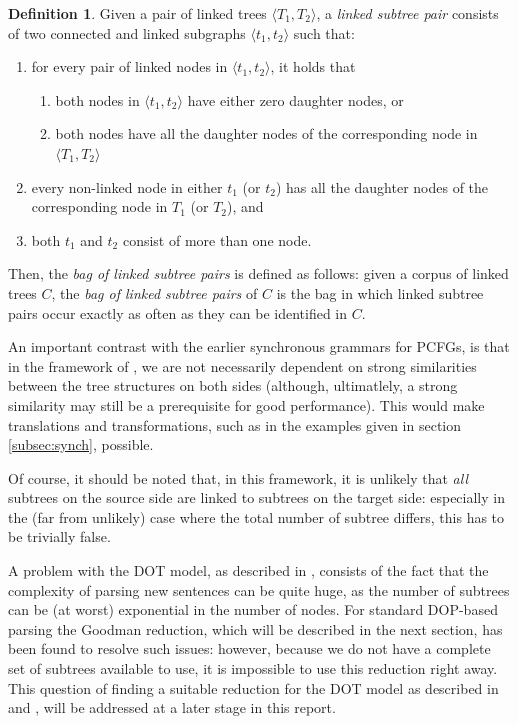 \documentclass[a4paper]{article}
\theoremstyle{definition}
\newtheorem{definition}[theorem]{Definition}
\begin{document}
\begin{definition}
Given a pair of linked trees $\langle T_1, T_2 \rangle$, a \emph{linked subtree
pair} consists of two connected and linked subgraphs $\langle t_1, t_2 \rangle$
such that:

\begin{enumerate}
\item for every pair of linked nodes in $\langle t_1, t_2 \rangle$, it holds that
	\begin{enumerate}
	\item both nodes in $\langle t_1, t_2 \rangle$ have either zero
		daughter nodes, or
	\item both nodes have all the daughter nodes of the corresponding node
		in $\langle T_1, T_2 \rangle$
	\end{enumerate}
\item every non-linked node in either $t_1$ (or $t_2$) has all the daughter
	nodes of the corresponding node in $T_1$ (or $T_2$), and
\item both $t_1$ and $t_2$ consist of more than one node.
\end{enumerate}
\end{definition}

Then, the \emph{bag of linked subtree pairs} is defined as follows: given a
corpus of linked trees $C$, the \emph{bag of linked subtree pairs} of $C$ is
the bag in which linked subtree pairs occur exactly as often as they can be
identified in $C$.

An important contrast with the earlier synchronous grammars for PCFGs, is that
in the framework of \cite{Po}, we are not necessarily dependent on strong
similarities between the tree structures on both sides (although, ultimatlely,
a strong similarity may still be a prerequisite for good performance). This
would make translations and transformations, such as in the examples given in
section \ref{subsec:synch}, possible.

Of course, it should be noted that, in this framework, it is unlikely that
\emph{all} subtrees on the source side are linked to subtrees on the target
side: especially in the (far from unlikely) case where the total number of
subtree differs, this has to be trivially false.

A problem with the DOT model, as described in \cite{Po}, consists of the fact
that the complexity of parsing new sentences can be quite huge, as the number
of subtrees can be (at worst) exponential in the number of nodes. For standard
DOP-based parsing the Goodman reduction, which will be described in the next
section, has been found to resolve such issues: however, because we do not have
a complete set of subtrees available to use, it is impossible to use this
reduction right away. This question of finding a suitable reduction for the DOT
model as described in \cite{Po} and \cite{Po2}, will be addressed at a later
stage in this report.
\end{document}
